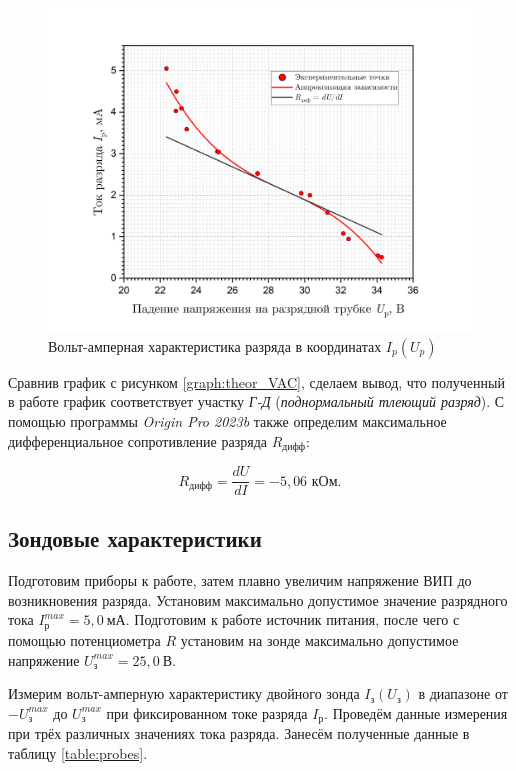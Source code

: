 \documentclass[a4paper, 12pt]{article}
\begin{document}
     \begin{figure}[H]
         \centering
         \includegraphics[width = 14 cm]{images/graph_VAC.png}
         \caption{Вольт-амперная характеристика разряда в координатах $I_p(U_p)$}
         \label{graph:VAC}
     \end{figure}
     
     Сравнив график с рисунком \ref{graph:theor_VAC}, сделаем вывод, что полученный в работе график соответствует участку \textit{Г-Д} (\textit{поднормальный тлеющий разряд}). С помощью программы \textit{Origin Pro 2023b} также определим максимальное дифференциальное сопротивление разряда $R_\text{дифф}$:

     \begin{equation}
         R_\text{дифф} = \frac{dU}{dI} = -5,06 \text{ кОм}.
     \end{equation}

    \subsection{Зондовые характеристики}

    Подготовим приборы к работе, затем плавно увеличим напряжение ВИП до возникновения разряда. Установим максимально допустимое значение разрядного тока $I_{\text{р}}^{max} = 5,0 ~ \text{мА}$. Подготовим к работе источник питания, после чего с помощью потенциометра $R$ установим на зонде максимально допустимое напряжение $U_{\text{з}}^{max} = 25,0~\text{В}$.
        
    Измерим вольт-амперную характеристику двойного зонда $I_{\text{з}} \left( U_{\text{з}} \right)$ в диапазоне от $-U^{max}_{\text{з}}$ до $U^{max}_{\text{з}}$ при фиксированном токе разряда $I_{\text{р}}$. Проведём данные измерения при трёх различных значениях тока разряда. Занесём полученные данные в таблицу \ref{table:probes}.
\end{document}
